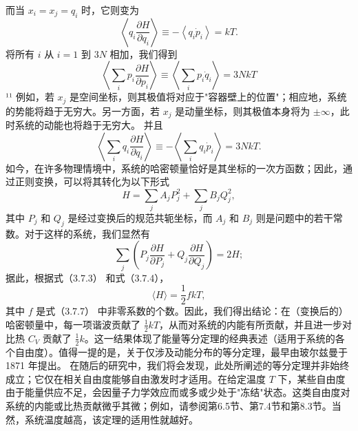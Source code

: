 而当 \(x_{i}=x_{j}=q_{i}\) 时，它则变为
\begin{equation}\tag{3.5.40}\label{eq:3.5.40}
\left\langle q _ { i } \frac { \partial H } { \partial q _ { i } } \right\rangle \equiv - \left\langle q _ { i } \dot { p } _ { i } \right\rangle = k T .
\end{equation}
将所有 \(i\) 从 \(i=1\) 到 \(3N\) 相加，我们得到
\begin{equation}\tag{3.5.41}\label{eq:3.5.41}
\left\langle \sum _ { i } p _ { i } { \frac { \partial H } { \partial p _ { i } } } \right\rangle \equiv \left\langle \sum _ { i } p _ { i } { \dot { q } } _ { i } \right\rangle = 3 N k T
\end{equation}
¹¹ 例如，若 \(x_{j}\) 是空间坐标，则其极值将对应于"容器壁上的位置"；相应地，系统的势能将趋于无穷大。另一方面，若 \(x_{j}\) 是动量坐标，则其极值本身将为 \(\pm\infty\)，此时系统的动能也将趋于无穷大。
并且
\begin{equation}\tag{3.5.42}\label{eq:3.5.42}
\left\langle \sum _ { i } q _ { i } \frac { \partial H } { \partial q _ { i } } \right\rangle \equiv - \left\langle \sum _ { i } q _ { i } \dot { p } _ { i } \right\rangle = 3 N k T .
\end{equation}
如今，在许多物理情境中，系统的哈密顿量恰好是其坐标的一次方函数；因此，通过正则变换，可以将其转化为以下形式
\begin{equation}\tag{3.5.43}\label{eq:3.5.43}
H = \sum _ { j } A _ { j } P _ { j } ^{2} + \sum _ { j } B _ { j } Q _ { j } ^{2} ,
\end{equation}
其中 \(P_{j}\) 和 \(Q_{j}\) 是经过变换后的规范共轭坐标，而 \(A_{j}\) 和 \(B_{j}\) 则是问题中的若干常数。对于这样的系统，我们显然有
\begin{equation}\tag{3.5.44}\label{eq:3.5.44}
\sum _ { j } \left( P _ { j } \frac { \partial H } { \partial P _ { j } } + Q _ { j } \frac { \partial H } { \partial Q _ { j } } \right) = 2 H ;
\end{equation}
据此，根据式（3.7.3） 和式（3.7.4），
\begin{equation}\tag{3.5.45}\label{eq:3.5.45}
\langle H \rangle = \frac { 1 } { 2 } f k T ,
\end{equation}
其中 \(f\) 是式（3.7.7） 中非零系数的个数。因此，我们得出结论：在（变换后的）哈密顿量中，每一项谐波贡献了 \(\frac{1}{2}kT\)，从而对系统的内能有所贡献，并且进一步对比热 \(C_V\) 贡献了 \(\frac{1}{2}k\)。这一结果体现了能量等分定理的经典表述（适用于系统的各个自由度）。值得一提的是，关于仅涉及动能分布的等分定理，最早由玻尔兹曼于 1871 年提出。
在随后的研究中，我们将会发现，此处所阐述的等分定理并非始终成立；它仅在相关自由度能够自由激发时才适用。在给定温度 \(T\) 下，某些自由度由于能量供应不足，会因量子力学效应而或多或少处于"冻结"状态。这类自由度对系统的内能或比热贡献微乎其微；例如，请参阅第6.5节、第7.4节和第8.3节。当然，系统温度越高，该定理的适用性就越好。
